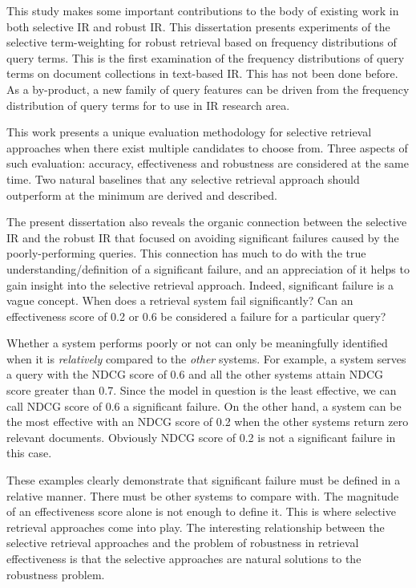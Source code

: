 This study makes some important contributions to the body of existing work in both selective IR and robust IR. 
This dissertation presents experiments of the selective term-weighting for robust retrieval based on frequency distributions of query terms. 
This is the first examination of the frequency distributions of query terms on document collections in text-based IR. 
This has not been done before. 
As a by-product, a new family of query features can be driven from the frequency distribution of query terms for to use in IR research area.

This work presents a unique evaluation methodology for selective retrieval approaches when there exist multiple candidates to choose from.
Three aspects of such evaluation: accuracy, effectiveness and robustness are considered at the same time.
Two natural baselines that any selective retrieval approach should outperform at the minimum are derived and described.

The present dissertation also reveals the organic connection between the selective IR and the robust IR that focused on avoiding significant failures caused by the poorly-performing queries. 
This connection has much to do with the true understanding/definition of a significant failure, and an appreciation of it helps to gain insight into the selective retrieval approach.
Indeed, significant failure is a vague concept. 
When does a retrieval system fail significantly?
Can an effectiveness score of 0.2 or 0.6 be considered a failure for a particular query?

Whether a system performs poorly or not can only be meaningfully identified when it is \emph{relatively} compared to the \emph{other} systems.
For example, a system serves a query with the NDCG score of 0.6 and all the other systems attain NDCG score greater than 0.7. 
Since the model in question is the least effective, we can call NDCG score of 0.6 a significant failure.
On the other hand, a system can be the most effective with an NDCG score of 0.2 when the other systems return zero relevant documents.
Obviously NDCG score of 0.2 is not a significant failure in this case.

These examples clearly demonstrate that significant failure must be defined in a relative manner.
There must be other systems to compare with. 
The magnitude of an effectiveness score alone is not enough to define it. 
This is where selective retrieval approaches come into play.
The interesting relationship between the selective retrieval approaches and the problem of robustness in retrieval effectiveness is that the selective approaches are natural solutions to the robustness problem.


